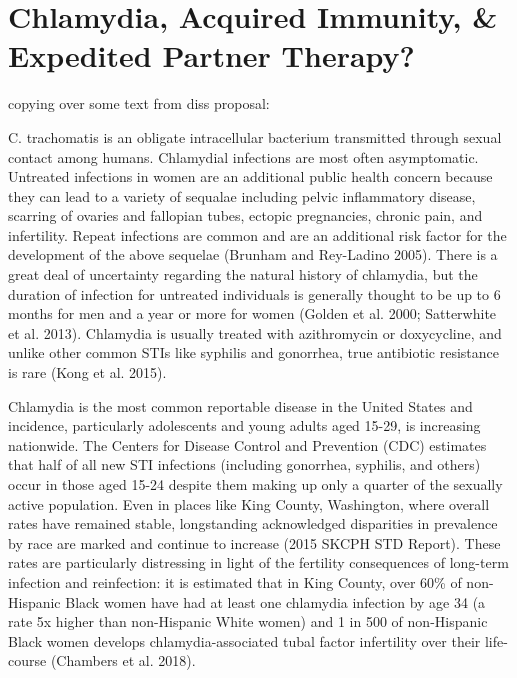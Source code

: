 \documentclass [11pt, proquest] {uwthesis}[2015/03/03]
\begin{document}
\chapter{Chlamydia, Acquired Immunity, \& Expedited Partner
Therapy?}\label{ept}

copying over some text from diss proposal:

C. trachomatis is an obligate intracellular bacterium transmitted
through sexual contact among humans. Chlamydial infections are most
often asymptomatic. Untreated infections in women are an additional
public health concern because they can lead to a variety of sequalae
including pelvic inflammatory disease, scarring of ovaries and fallopian
tubes, ectopic pregnancies, chronic pain, and infertility. Repeat
infections are common and are an additional risk factor for the
development of the above sequelae (Brunham and Rey-Ladino 2005). There
is a great deal of uncertainty regarding the natural history of
chlamydia, but the duration of infection for untreated individuals is
generally thought to be up to 6 months for men and a year or more for
women (Golden et al. 2000; Satterwhite et al. 2013). Chlamydia is
usually treated with azithromycin or doxycycline, and unlike other
common STIs like syphilis and gonorrhea, true antibiotic resistance is
rare (Kong et al. 2015).

Chlamydia is the most common reportable disease in the United States and
incidence, particularly adolescents and young adults aged 15-29, is
increasing nationwide. The Centers for Disease Control and Prevention
(CDC) estimates that half of all new STI infections (including
gonorrhea, syphilis, and others) occur in those aged 15-24 despite them
making up only a quarter of the sexually active population. Even in
places like King County, Washington, where overall rates have remained
stable, longstanding acknowledged disparities in prevalence by race are
marked and continue to increase (2015 SKCPH STD Report). These rates are
particularly distressing in light of the fertility consequences of
long-term infection and reinfection: it is estimated that in King
County, over 60\% of non-Hispanic Black women have had at least one
chlamydia infection by age 34 (a rate 5x higher than non-Hispanic White
women) and 1 in 500 of non-Hispanic Black women develops
chlamydia-associated tubal factor infertility over their life-course
(Chambers et al. 2018).
\end{document}
